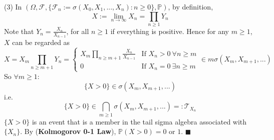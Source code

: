 \documentclass[a4paper,12pt,twoside]{book}
\begin{document}
\begin{itemize}
\begin{itemize}
	(3) In $(\Omega, \mathcal{F}, \{\mathcal{F}_n:=\sigma(X_0,X_1, ..., X_n):n\geq 0 \}, \mathbb{P})$, by definition, 
	\begin{equation}
		X:= \lim\limits_{n\rightarrow\infty}X_n = \prod_{n\geq 1}Y_n
	\end{equation}
	Note that $Y_n=\frac{X_n}{X_{n-1}}$, for all $n\geq 1$ if everything is positive. Hence for any $m\geq 1$, $X$ can be regarded as
	\begin{equation}
		X=X_m\prod_{n\geq m+1}Y_n=\begin{cases}X_m \prod_{n\geq m+1}\frac{X_n}{X_{n-1}} &\text{If $X_n>0~\forall n\geq m$} \\ 0 &\text{If $X_n=0~\exists n\geq m$}\end{cases} \in m\sigma(X_m, X_{m+1}, ...)
	\end{equation}
	So $\forall m\geq 1$:
	\begin{equation}
		\{X>0\}\in\sigma(X_m, X_{m+1}, ...) 
	\end{equation}
	i.e. 
	\begin{equation}
		\{X>0\} \in \bigcap_{m\geq 1}\sigma(X_m, X_{m+1}, ...)=: \mathcal{T}_{{X_n}}
	\end{equation}
	$\{X>0\}$ is an event that is a member in the tail sigma algebra associated with $\{X_n\}$. By (\textbf{Kolmogorov 0-1 Law}), $\mathbb{P}(X>0)=0$ or $1.$ $\blacksquare$
	\newline


\end{itemize}
\end{itemize}
\end{document}
